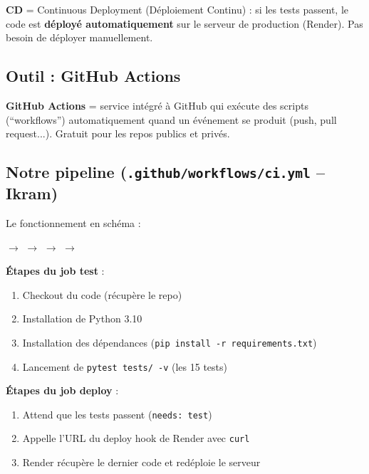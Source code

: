 \documentclass[12pt,a4paper]{article}
\begin{document}
\begin{definitionbox}
\textbf{CD} = Continuous Deployment (Déploiement Continu) : si les tests passent, le code est \textbf{déployé automatiquement} sur le serveur de production (Render). Pas besoin de déployer manuellement.
\end{definitionbox}

\subsection{Outil : GitHub Actions}

\begin{definitionbox}
\textbf{GitHub Actions} = service intégré à GitHub qui exécute des scripts (``workflows'') automatiquement quand un événement se produit (push, pull request...). Gratuit pour les repos publics et privés.
\end{definitionbox}

\subsection{Notre pipeline (\texttt{.github/workflows/ci.yml} -- Ikram)}

Le fonctionnement en schéma :

\begin{center}
 $\rightarrow$  $\rightarrow$ \checkmark $\rightarrow$  $\rightarrow$ 
\end{center}

\textbf{Étapes du job test} :
\begin{enumerate}
    \item Checkout du code (récupère le repo)
    \item Installation de Python 3.10
    \item Installation des dépendances (\texttt{pip install -r requirements.txt})
    \item Lancement de \texttt{pytest tests/ -v} (les 15 tests)
\end{enumerate}

\textbf{Étapes du job deploy} :
\begin{enumerate}
    \item Attend que les tests passent (\texttt{needs: test})
    \item Appelle l'URL du deploy hook de Render avec \texttt{curl}
    \item Render récupère le dernier code et redéploie le serveur
\end{enumerate}
\end{document}
